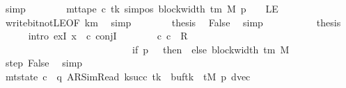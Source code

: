 \begin{isabellebody}
\ simp\isanewline
\ \ \ \ \ \ \isamarkupfalse%
\ {\isachardoublequoteopen}mt{\isacharunderscore}{\kern0pt}tape\ c{\isacharprime}{\kern0pt}\ tk\ {\isacharparenleft}{\kern0pt}sim{\isacharunderscore}{\kern0pt}pos\ {\isacharparenleft}{\kern0pt}block{\isacharunderscore}{\kern0pt}width\ {\isacharparenleft}{\kern0pt}{\isasymGamma}{\isacharunderscore}{\kern0pt}tm\ M{\isacharparenright}{\kern0pt}{\isacharparenright}{\kern0pt}\ p\ {\isacharminus}{\kern0pt}\ {}{\isacharparenright}{\kern0pt}\ {\isasymnoteq}\ LE{}{\isachardoublequoteclose}\isanewline
\ \ \ \ \ \ \ \ \isamarkupfalse%
\ write{\isacharunderscore}{\kern0pt}bit{\isacharunderscore}{\kern0pt}not{\isacharunderscore}{\kern0pt}LE{}{\isacharbrackleft}{\kern0pt}OF\ km{}{\isacharbrackright}{\kern0pt}\ \isamarkupfalse%
\ simp\isanewline
\ \ \ \ \ \ \isamarkupfalse%
\ {\isacharquery}{\kern0pt}thesis\ \isamarkupfalse%
\ False\ \isamarkupfalse%
\ simp\isanewline
\ \ \ \ \isamarkupfalse%
\isanewline
\ \ \ \ \isamarkupfalse%
\ {\isacharquery}{\kern0pt}thesis\isanewline
\ \ \ \ \isamarkupfalse%
\ {\isacharparenleft}{\kern0pt}intro\ exI{\isacharbrackleft}{\kern0pt}\ x\ {\isacharequal}{\kern0pt}\ c{\isacharprime}{\kern0pt}{\isacharprime}{\kern0pt}{\isacharbrackright}{\kern0pt}\ conjI{\isacharparenright}{\kern0pt}\isanewline
\ \ \ \ \ \ \isamarkupfalse%
\ {\isachardoublequoteopen}{\isacharparenleft}{\kern0pt}c{\isacharprime}{\kern0pt}{\isacharcomma}{\kern0pt}\ c{\isacharprime}{\kern0pt}{\isacharprime}{\kern0pt}{\isacharparenright}{\kern0pt}\ {\isasymin}\ R{\isacharprime}{\kern0pt}\isanewline
\ \ \ \ \ \ \ \ \ \ \ \ \ \ \ \ \ \ \ \ \ \ \ \ \ \ {\isacharcircum}{\kern0pt}{\isacharcircum}{\kern0pt}\ {\isacharparenleft}{\kern0pt}if\ p\ {\isacharequal}{\kern0pt}\ {}\ then\ {}\ else\ block{\isacharunderscore}{\kern0pt}width\ {\isacharparenleft}{\kern0pt}{\isasymGamma}{\isacharunderscore}{\kern0pt}tm\ M{\isacharparenright}{\kern0pt}\ {\isacharplus}{\kern0pt}\ {}{\isacharparenright}{\kern0pt}{\isachardoublequoteclose}\isanewline
\ \ \ \ \ \ \ \ \isamarkupfalse%
\ step\ False\ \isamarkupfalse%
\ simp\isanewline
\ \ \ \ \ \ \isamarkupfalse%
\ {\isachardoublequoteopen}mt{\isacharunderscore}{\kern0pt}state\ c{\isacharprime}{\kern0pt}{\isacharprime}{\kern0pt}\ {\isacharequal}{\kern0pt}\ {\isacharparenleft}{\kern0pt}q{\isacharcomma}{\kern0pt}\ AR{\isacharunderscore}{\kern0pt}SimRead{\isacharcomma}{\kern0pt}\ k{\isacharunderscore}{\kern0pt}succ\ tk{\isacharcomma}{\kern0pt}\ {}{\isacharcomma}{\kern0pt}\ buf{\isacharparenleft}{\kern0pt}tk\ {\isacharcolon}{\kern0pt}{\isacharequal}{\kern0pt}\ tM\ p{\isacharparenright}{\kern0pt}{\isacharcomma}{\kern0pt}\ dvec{\isacharcomma}{\kern0pt}\isanewline

\end{isabellebody}
